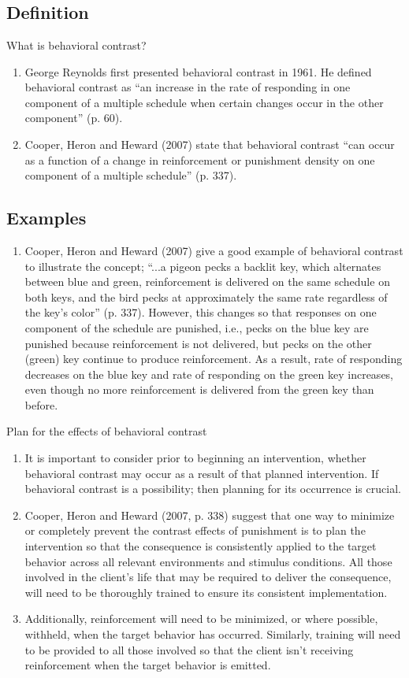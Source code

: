 \section{\foureSeven{}}
\subsection{Definition}
What is behavioral contrast?
\begin{enumerate}
\item George Reynolds first presented behavioral contrast in 1961. He defined behavioral contrast as ``an increase in the rate of responding in one component of a multiple schedule when certain changes occur in the other component'' (p. 60). 
\item Cooper, Heron and Heward (2007) state that behavioral contrast ``can occur as a function of a change in reinforcement or punishment density on one component of a multiple schedule'' (p. 337).
\end{enumerate}
%
\subsection{Examples}
\begin{enumerate}
\item Cooper, Heron and Heward (2007) give a good example of behavioral contrast to illustrate the concept; ``...a pigeon pecks a backlit key, which alternates between blue and green, reinforcement is delivered on the same schedule on both keys, and the bird pecks at approximately the same rate regardless of the key's color'' (p. 337). However, this changes so that responses on one component of the schedule are punished, i.e., pecks on the blue key are punished because reinforcement is not delivered, but pecks on the other (green) key continue to produce reinforcement. As a result, rate of responding decreases on the blue key and rate of responding on the green key increases, even though no more reinforcement is delivered from the green key than before.
\end{enumerate}
%
Plan for the effects of behavioral contrast
\begin{enumerate}
\item It is important to consider prior to beginning an intervention, whether behavioral contrast may occur as a result of that planned intervention. If behavioral contrast is a possibility; then planning for its occurrence is crucial.
\item Cooper, Heron and Heward (2007, p. 338) suggest that one way to minimize or completely prevent the contrast effects of punishment is to plan the intervention so that the consequence is consistently applied to the target behavior across all relevant environments and stimulus conditions. All those involved in the client's life that may be required to deliver the consequence, will need to be thoroughly trained to ensure its consistent implementation.
\item Additionally, reinforcement will need to be minimized, or where possible, withheld, when the target behavior has occurred. Similarly, training will need to be provided to all those involved so that the client isn't receiving reinforcement when the target behavior is emitted.
\end{enumerate}
%
